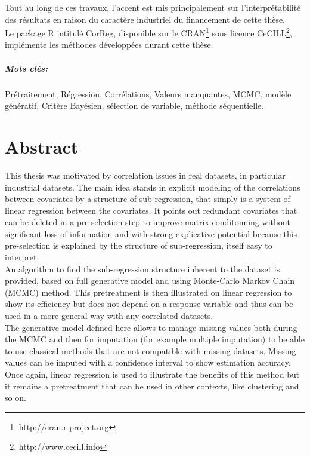 \documentclass[12pt,a4paper]{report}
\begin{document}
	Tout au long de ces travaux, l'accent est mis principalement sur l'interprétabilité des résultats en raison du caractère industriel du financement de cette thèse. 
\\	

	Le package R intitulé CorReg, disponible sur le CRAN\footnote{http://cran.r-project.org} sous licence CeCILL\footnote{http://www.cecill.info}, implémente les méthodes développées durant cette thèse.
	
\paragraph{Mots clés:}Prétraitement, Régression, Corrélations, Valeurs manquantes, MCMC, modèle génératif, Critère Bayésien, sélection de variable, méthode séquentielle.
\chapter*{Abstract}
	This thesis was motivated by correlation issues in real datasets, in particular industrial datasets. The main idea stands in explicit modeling of the correlations between covariates by a structure of sub-regression, that simply is a system of linear regression between the covariates. It points out redundant covariates that can be deleted in a pre-selection step to improve matrix conditonning without significant loss of information and with strong explicative potential because this pre-selection is explained by the structure of sub-regression, itself easy to interpret.
	\\
	
	An algorithm to find the sub-regression structure inherent to the dataset is provided, based on full generative model and using Monte-Carlo Markov Chain (MCMC) method. This pretreatment is then illustrated on linear regression to show its efficiency but does not depend on a response variable and thus can be used in a more general way with any correlated datasets.
	\\
	
	The generative model defined here allows to manage missing values both during the MCMC and then for imputation (for example multiple imputation) to be able to use classical methods that are not compatible with missing datasets. Missing values can be imputed with a confidence interval to show estimation accuracy. Once again, linear regression is used to illustrate the benefits of this method but it remains a pretreatment that can be used in other contexts, like clustering and so on.
	\\ 
	
\end{document}
